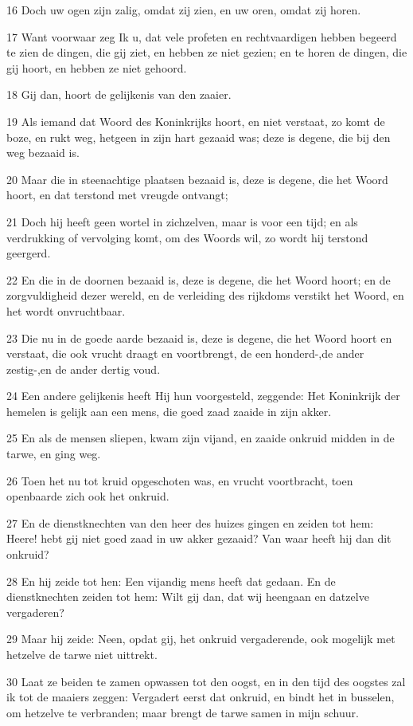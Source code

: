 \par 16 Doch uw ogen zijn zalig, omdat zij zien, en uw oren, omdat zij horen.
\par 17 Want voorwaar zeg Ik u, dat vele profeten en rechtvaardigen hebben begeerd te zien de dingen, die gij ziet, en hebben ze niet gezien; en te horen de dingen, die gij hoort, en hebben ze niet gehoord.
\par 18 Gij dan, hoort de gelijkenis van den zaaier.
\par 19 Als iemand dat Woord des Koninkrijks hoort, en niet verstaat, zo komt de boze, en rukt weg, hetgeen in zijn hart gezaaid was; deze is degene, die bij den weg bezaaid is.
\par 20 Maar die in steenachtige plaatsen bezaaid is, deze is degene, die het Woord hoort, en dat terstond met vreugde ontvangt;
\par 21 Doch hij heeft geen wortel in zichzelven, maar is voor een tijd; en als verdrukking of vervolging komt, om des Woords wil, zo wordt hij terstond geergerd.
\par 22 En die in de doornen bezaaid is, deze is degene, die het Woord hoort; en de zorgvuldigheid dezer wereld, en de verleiding des rijkdoms verstikt het Woord, en het wordt onvruchtbaar.
\par 23 Die nu in de goede aarde bezaaid is, deze is degene, die het Woord hoort en verstaat, die ook vrucht draagt en voortbrengt, de een honderd-,de ander zestig-,en de ander dertig voud.
\par 24 Een andere gelijkenis heeft Hij hun voorgesteld, zeggende: Het Koninkrijk der hemelen is gelijk aan een mens, die goed zaad zaaide in zijn akker.
\par 25 En als de mensen sliepen, kwam zijn vijand, en zaaide onkruid midden in de tarwe, en ging weg.
\par 26 Toen het nu tot kruid opgeschoten was, en vrucht voortbracht, toen openbaarde zich ook het onkruid.
\par 27 En de dienstknechten van den heer des huizes gingen en zeiden tot hem: Heere! hebt gij niet goed zaad in uw akker gezaaid? Van waar heeft hij dan dit onkruid?
\par 28 En hij zeide tot hen: Een vijandig mens heeft dat gedaan. En de dienstknechten zeiden tot hem: Wilt gij dan, dat wij heengaan en datzelve vergaderen?
\par 29 Maar hij zeide: Neen, opdat gij, het onkruid vergaderende, ook mogelijk met hetzelve de tarwe niet uittrekt.
\par 30 Laat ze beiden te zamen opwassen tot den oogst, en in den tijd des oogstes zal ik tot de maaiers zeggen: Vergadert eerst dat onkruid, en bindt het in busselen, om hetzelve te verbranden; maar brengt de tarwe samen in mijn schuur.
